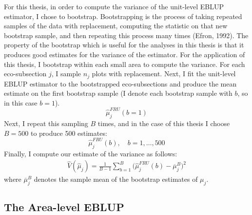 \documentclass[12pt,twoside]{reedthesis}
\begin{document}
For this thesis, in order to compute the variance of the unit-level EBLUP estimator, I chose to bootstrap. Bootstrapping is the process of taking repeated samples of the data with replacement, computing the statistic on that new bootstrap sample, and then repeating this process many times (Efron, 1992). The property of the bootstrap which is useful for the analyses in this thesis is that it produces good estimates for the variance of the estimator. For the application of this thesis, I bootstrap within each small area to compute the variance. For each eco-subsection \(j\), I sample \(n_j\) plots with replacement. Next, I fit the unit-level EBLUP estimator to the bootstrapped eco-subsections and produce the mean estimate on the first bootstrap sample (I denote each bootstrap sample with \(b\), so in this case \(b=1\)).
\[
\hat\mu_j^{FRU}(b=1)
\]
Next, I repeat this sampling \(B\) times, and in the case of this thesis I choose \(B = 500\) to produce 500 estimates:
\[
\hat\mu_j^{FRU}(b), \quad b = 1,\dots,500
\]
Finally, I compute our estimate of the variance as follows:
\begin{align}
\hat V(\hat\mu_j) = \frac{1}{B-1} \sum_{b=1}^{B}\Big(\hat\mu^{FRU}_j(b) - \overline\mu_j^B\Big)^2
\end{align}
where \(\overline\mu_j^B\) denotes the sample mean of the bootstrap estimates of \(\mu_j\).

\hypertarget{the-area-level-eblup}{%
\subsection{The Area-level EBLUP}\label{the-area-level-eblup}}
\end{document}
